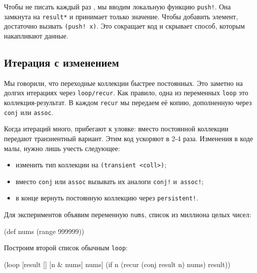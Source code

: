 
Чтобы не писать каждый раз , мы вводим
локальную функцию \verb|push!|. Она замкнута на \verb|result*| и принимает
только значение. Чтобы добавить элемент, достаточно вызвать
\verb|(push! x)|. Это сокращает код и скрывает способ, которым накапливают
данные.

\subsection{Итерация с изменением}


Мы говорили, что переходные коллекции быстрее постоянных. Это заметно на долгих
итерациях через \verb|loop/recur|. Как правило, одна из переменных
\verb|loop| это коллекция-результат. В каждом \verb|recur| мы передаем её
копию, дополненную через \verb|conj| или \verb|assoc|.

Когда итераций много, прибегают к уловке: вместо постоянной коллекции передают
транзиентный вариант. Этим код ускоряют в 2-4 раза. Изменения в коде малы,
нужно лишь учесть следующее:

\begin{itemize}

\item
  изменить тип коллекции на \verb|(transient <coll>)|;

\item
  вместо \verb|conj| или \verb|assoc| вызывать их аналоги \verb|conj!|
  и~\verb|assoc!|;

\item
  в конце вернуть постоянную коллекцию через \verb|persistent!|.

\end{itemize}

Для экспериментов объявим переменную \verb|nums|, список из миллиона целых
чисел:

\begin{english}
  \begin{clojure}
(def nums (range 999999))
  \end{clojure}
\end{english}


\noindent
Построим второй список обычным \verb|loop|:

\begin{english}
  \begin{clojure}
(loop [result []
       [n & nums] nums]
  (if n
    (recur (conj result n) nums)
    result))
  \end{clojure}
\end{english}

